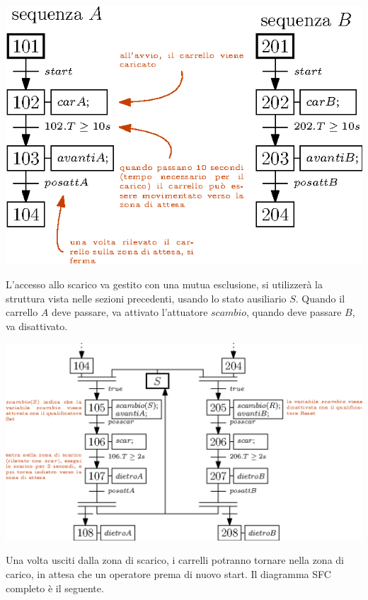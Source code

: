 \documentclass[10pt, letterpaper]{report}
\begin{document}
\begin{center}
    \includegraphics[width=1\textwidth ]{images/SFCCarrelli.eps}
\end{center}
L'accesso allo scarico va gestito con una mutua esclusione, si utilizzerà la struttura vista nelle sezioni precedenti, usando lo stato ausiliario $S$. Quando il carrello $A$ deve passare, va attivato l'attuatore $scambio$, quando deve passare $B$, va disattivato.
\begin{center}
    \includegraphics[width=1\textwidth ]{images/SFCCarrelli2.eps}
\end{center}\vfill
Una volta usciti dalla zona di scarico, i carrelli potranno tornare nella zona di carico, in attesa che un operatore prema di nuovo start.\acc 
Il diagramma SFC completo è il seguente.
\end{document}
